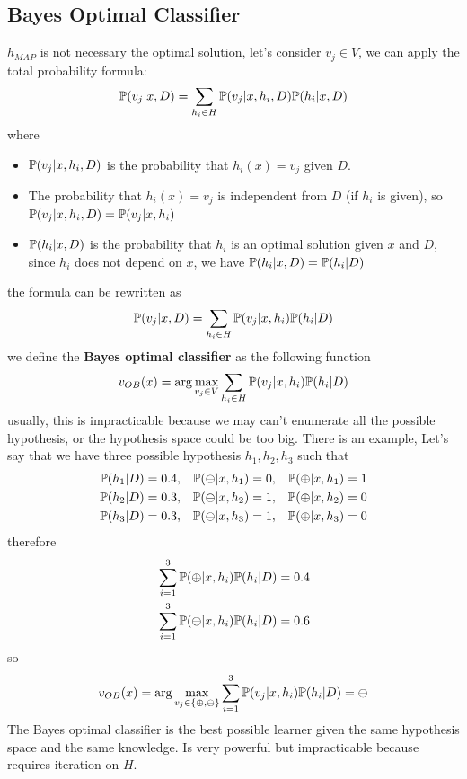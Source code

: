 \documentclass[10pt, letterpaper]{report}
\begin{document}
\subsection{Bayes Optimal Classifier}
$h_{MAP}$ is not necessary the optimal solution, let's consider $v_j\in V$, we can apply the total probability formula:\begin{equation}
    {\mathbb P}(v_j|x,D)=\sum_{h_i\in H}{\mathbb P}(v_j|x,h_i,D){\mathbb P}(h_i|x,D)
\end{equation}
where \begin{itemize}
    \item ${\mathbb P}(v_j|x,h_i,D)$ is the probability that $h_i(x)=v_j$ given $D$.
    \item The probability that  $h_i(x)=v_j$ is independent from $D$ (if $h_i$ is given), so ${\mathbb P}(v_j|x,h_i,D)={\mathbb P}(v_j|x,h_i)$
    \item ${\mathbb P}(h_i|x,D)$ is the probability that $h_i$ is an optimal solution given $x$ and $D$, since $h_i$ does not depend on $x$, we have ${\mathbb P}(h_i|x,D)={\mathbb P}(h_i|D)$ 
\end{itemize}
the formula can be rewritten as\begin{equation}
    {\mathbb P}(v_j|x,D)=\sum_{h_i\in H}{\mathbb P}(v_j|x,h_i){\mathbb P}(h_i|D)
\end{equation}
we define the \textbf{Bayes optimal classifier} as the following function\begin{equation}
    v_{OB}(x)=\arg\max_{v_j\in V}\sum_{h_i\in H}{\mathbb P}(v_j|x,h_i){\mathbb P}(h_i|D)
\end{equation}
usually, this is impracticable because we may can't enumerate all the possible hypothesis, or the hypothesis space could be too big. There is an example, Let's say that we have three possible hypothesis $h_1,h_2,h_3$ such that
\begin{align*}
{\mathbb P}(h_1|D) &= 0.4, & {\mathbb P}(\ominus|x, h_1) &= 0, & {\mathbb P}(\oplus|x, h_1) &= 1 \\
{\mathbb P}(h_2|D) &= 0.3, & {\mathbb P}(\ominus|x, h_2) &= 1, & {\mathbb P}(\oplus|x, h_2) &= 0 \\
{\mathbb P}(h_3|D) &= 0.3, & {\mathbb P}(\ominus|x, h_3) &= 1, & {\mathbb P}(\oplus|x, h_3) &= 0
\end{align*}
therefore\begin{align*}
    &\sum_{i=1}^3{\mathbb P}(\oplus|x,h_i){\mathbb P}(h_i|D)=0.4\\
    &\sum_{i=1}^3{\mathbb P}(\ominus|x,h_i){\mathbb P}(h_i|D)=0.6
\end{align*}
so\begin{equation}
    v_{OB}(x)=\arg\max_{v_j\in\{\oplus,\ominus\}}\sum_{i=1}^3{\mathbb P}(v_j|x,h_i){\mathbb P}(h_i|D)=\ominus
\end{equation}
The Bayes optimal classifier is the best possible learner given the same hypothesis space and the same knowledge. Is very powerful but impracticable because requires iteration on $H$.\bigskip
\end{document}
